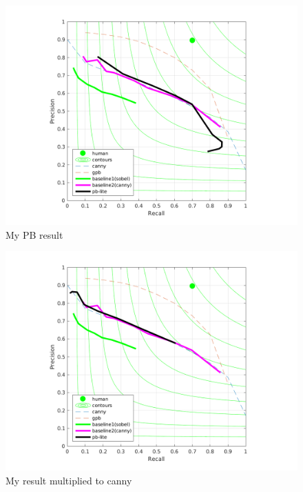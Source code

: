 \documentclass[12pt]{article}
\begin{document}
\begin{figure}
    \includegraphics[width=\linewidth]{img/PR_Curve2}
    \caption{My PB result}
    \label{fig_prcurve}
\end{figure}

\begin{figure}
    \includegraphics[width=\linewidth]{img/PR_Curve}
    \caption{My result multiplied to canny}
    \label{fig_prcurve}
\end{figure}
\end{document}

